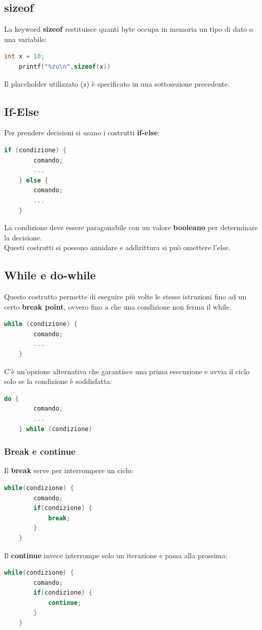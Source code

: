 \documentclass[12pt,a4paper]{article}
\begin{document}
\subsection{sizeof}
La keyword \textbf{sizeof} restituisce quanti byte occupa in memoria un tipo di dato o una variabile:
\begin{lstlisting}[language=C]
    int x = 10;
    printf("%zu\n",sizeof(x))
\end{lstlisting}
Il placeholder utilizzato (z) è specificato in una sottosezione precedente.
\subsection{If-Else}
Per prendere decisioni si usano i costrutti \textbf{if-else}:
\begin{lstlisting}[language=C]
    if (condizione) {
        comando;
        ...
    } else {
        comando;
        ...
    }
\end{lstlisting}
La condizione deve essere paragonabile con un valore \textbf{booleano} per determinare la decisione.\\
Questi costrutti si possono annidare e addirittura si può omettere l'else.
\subsection{While e do-while}
Questo costrutto permette di eseguire più volte le stesse istruzioni fino ad un certo \textbf{break point}, ovvero fino a che una condizione non ferma il while.
\begin{lstlisting}[language=C]
    while (condizione) {
        comando;
        ...
    }
\end{lstlisting}
C'è un'opzione alternativa che garantisce una prima esecuzione e avvia il ciclo solo se la condizione è soddisfatta:
\begin{lstlisting}[language=C]
    do {
        comando;
        ...
    } while (condizione)
\end{lstlisting}
\subsubsection{Break e continue}
Il \textbf{break} serve per interrompere un ciclo:
\begin{lstlisting}[language=C]
    while(condizione) {
        comando;
        if(condizione) {
            break;
        }
    }
\end{lstlisting} 
Il \textbf{continue} invece interrompe solo un iterazione e passa alla prossima:
\begin{lstlisting}[language=C]
    while(condizione) {
        comando;
        if(condizione) {
            continue;
        }
    }
\end{lstlisting} 
\end{document}
